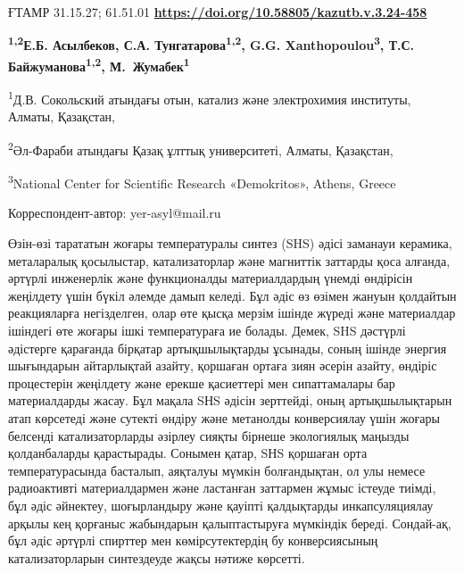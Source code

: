 \newpage
ҒТАМР 31.15.27; 61.51.01
\hfill {\bfseries \href{https://doi.org/10.58805/kazutb.v.3.24-458}{https://doi.org/10.58805/kazutb.v.3.24-458}}


\begin{center}
{\bfseries \textsuperscript{1,2}Е.Б. Асылбеков\envelope, С.А. Тунгатарова\textsuperscript{1,2}, G.G. Xanthopoulou\textsuperscript{3}, Т.С. Байжуманова\textsuperscript{1,2}, М.~Жумабек\textsuperscript{1}}

\textsuperscript{1}Д.В. Сокольский атындағы отын, катализ және
электрохимия институты, Алматы, Қазақстан,

\textsuperscript{2}Әл-Фараби атындағы Қазақ ұлттық университеті, Алматы,
Қазақстан,

\textsuperscript{3}National Center for Scientific Research «Demokritos»,
Athens, Greece
\end{center}
\envelope Корреспондент-автор: yer-asyl@mail.ru


Өзін-өзі тарататын жоғары температуралы синтез (SHS) әдісі заманауи
керамика, металаралық қосылыстар, катализаторлар және магниттік заттарды
қоса алғанда, әртүрлі инженерлік және функционалды материалдардың үнемді
өндірісін жеңілдету үшін бүкіл әлемде дамып келеді. Бұл әдіс өз өзімен
жануын қолдайтын реакцияларға негізделген, олар өте қысқа мерзім ішінде
жүреді және материалдар ішіндегі өте жоғары ішкі температураға ие
болады. Демек, SHS дәстүрлі әдістерге қарағанда бірқатар артықшылықтарды
ұсынады, соның ішінде энергия шығындарын айтарлықтай азайту, қоршаған
ортаға зиян әсерін азайту, өндіріс процестерін жеңілдету және ерекше
қасиеттері мен сипаттамалары бар материалдарды жасау. Бұл мақала SНS
әдісін зерттейді, оның артықшылықтарын атап көрсетеді және сутекті
өндіру және метанолды конверсиялау үшін жоғары белсенді катализаторларды
әзірлеу сияқты бірнеше экологиялық маңызды қолданбаларды қарастырады.
Сонымен қатар, SНS қоршаған орта температурасында басталып, аяқталуы
мүмкін болғандықтан, ол улы немесе радиоактивті материалдармен және
ластанған заттармен жұмыс істеуде тиімді, бұл әдіс әйнектеу,
шоғырландыру және қауіпті қалдықтарды инкапсуляциялау арқылы кең
қорғаныс жабындарын қалыптастыруға мүмкіндік береді. Сондай-ақ, бұл әдіс
әртүрлі спирттер мен көмірсутектердің бу конверсиясының катализаторларын
синтездеуде жақсы нәтиже көрсетті.

